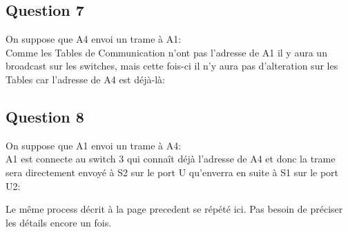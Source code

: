 \documentclass{article}
\begin{document}
\newpage
\subsection*{Question 7}
\begin{resolution}
    On suppose que A4 envoi un trame à A1:\\

    Comme les Tables de Communication n'ont pas l'adresse de A1 il y aura un broadcast sur les switches, mais cette fois-ci il n'y aura pas d'alteration sur les Tables car l'adresse de A4 est déjà-là:
\end{resolution}

\subsection*{Question 8}
\begin{resolution}
    On suppose que A1 envoi un trame à A4:\\

    A1 est connecte au switch 3 qui connaît déjà l'adresse de A4 et donc la trame sera directement envoyé à S2 sur le port U qu'enverra en suite à S1 sur le port U2:
    \begin{remark}
        Le même process décrit à la page precedent se répété ici. Pas besoin de préciser les détails encore un fois.
    \end{remark}
\end{resolution}
\end{document}
